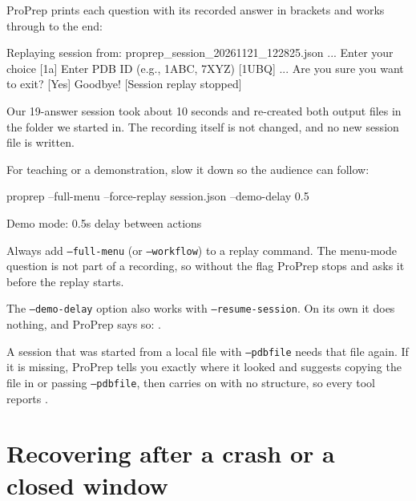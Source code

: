 ProPrep prints each question with its recorded answer in brackets and works
through to the end:

\begin{screen}
Replaying session from: proprep_session_20261121_122825.json
...
Enter your choice [1a]
Enter PDB ID (e.g., 1ABC, 7XYZ) [1UBQ]
...
Are you sure you want to exit? [Yes]
Goodbye!
[Session replay stopped]
\end{screen}

Our 19-answer session took about 10 seconds and re-created both output files
in the folder we started in. The recording itself is not changed, and no new
session file is written.

For teaching or a demonstration, slow it down so the audience can follow:

\begin{terminal}
proprep --full-menu --force-replay session.json --demo-delay 0.5
\end{terminal}

\begin{screen}
Demo mode: 0.5s delay between actions
\end{screen}

\begin{tip}
Always add \texttt{--full-menu} (or \texttt{--workflow}) to a replay command.
The menu-mode question is not part of a recording, so without the flag ProPrep
stops and asks it before the replay starts.
\end{tip}

The \texttt{--demo-delay} option also works with \texttt{--resume-session}. On
its own it does nothing, and ProPrep says so:
.

\begin{watchout}
A session that was started from a local file with \texttt{--pdbfile} needs
that file again. If it is missing, ProPrep tells you exactly where it looked
and suggests copying the file in or passing \texttt{--pdbfile}, then carries
on with no structure, so every tool reports
.
\end{watchout}

\section{Recovering after a crash or a closed window}
\label{sec:sessions-crash}

